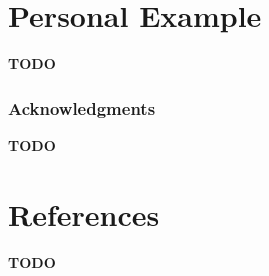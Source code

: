 \documentclass{article}
\newcommand{\todo}[1]{{\bf TODO #1}\\}
\begin{document}
\newpage
\section{Personal Example}
\todo{}
\vspace{5in}



\subsubsection*{Acknowledgments}
\todo{}
\section*{References}
\todo{}

%
\end{document}
